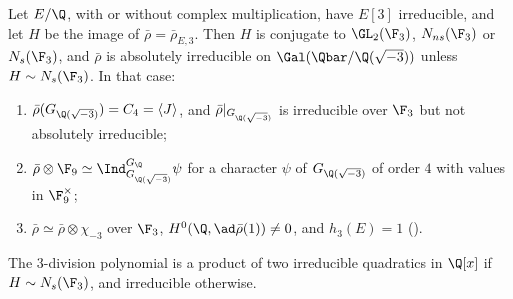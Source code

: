 \begin{proposition}\label{prop:galrep:ns}
Let $E/\Q$, with or without complex multiplication, have $E[3]$ irreducible, and let $H$ be the image of $\bar\rho=\bar\rho_{E,3}$. Then $H$ is conjugate to
$\GL_2(\F_3)$, $N_{ns}(\F_3)$ or $N_s(\F_3)$, and $\bar\rho$ is absolutely irreducible on $\Gal(\Qbar/\Q(\sqrt{-3}))$ unless $H\sim N_s(\F_3)$. In that case:
\begin{enumerate}[label=(\roman*)]
\item $\bar\rho(G_{\Q(\sqrt{-3})})=C_4=\langle J\rangle$, and $\bar\rho|_{G_{\Q(\sqrt{-3})}}$ is irreducible over $\F_3$ but not absolutely irreducible;
\item $\bar\rho\otimes\F_9\simeq\Ind_{G_{\Q(\sqrt{-3})}}^{G_\Q}\psi$ for a character $\psi$ of $G_{\Q(\sqrt{-3})}$ of order $4$ with values in $\F_9^\times$;
\item $\bar\rho\simeq\bar\rho\otimes\chi_{-3}$ over $\F_3$, $H^0(\Q,\ad\bar\rho(1))\ne0$, and $h_3(E)=1$ ().
\end{enumerate}
The $3$-division polynomial is a product of two irreducible quadratics in $\Q[x]$ if $H\sim N_s(\F_3)$, and irreducible otherwise.
\end{proposition}


